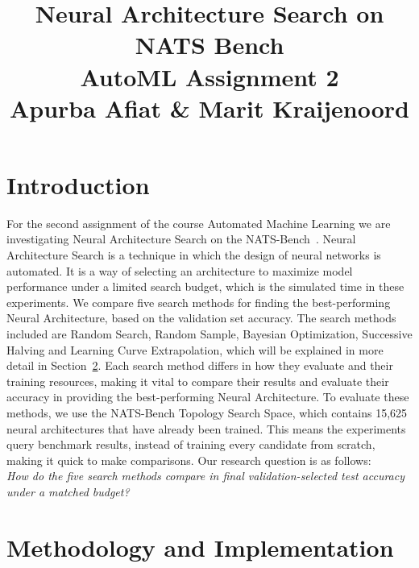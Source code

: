 \documentclass[12pt]{article}
\title{Neural Architecture Search on NATS Bench \\ \large AutoML Assignment 2 \\ \small Apurba Afiat \& Marit Kraijenoord}
\date{}
\author{}
\begin{document}
\maketitle

\vspace{-2.8cm}


\section{Introduction}
For the second assignment of the course Automated Machine Learning we are investigating Neural Architecture Search on the NATS-Bench~\cite{dong2022natsbench}. Neural Architecture Search is a technique in which the design of neural networks is automated. It is a way of selecting an architecture to maximize model performance under a limited search budget, which is the simulated time in these experiments. We compare five search methods for finding the best-performing Neural Architecture, based on the validation set accuracy. The search methods included are Random Search, Random Sample, Bayesian Optimization, Successive Halving and Learning Curve Extrapolation, which will be explained in more detail in Section~\ref{methods}. Each search method differs in how they evaluate and their training resources, making it vital to compare their results and evaluate their accuracy in providing the best-performing Neural Architecture. To evaluate these methods, we use the NATS-Bench Topology Search Space, which contains 15,625 neural architectures that have already been trained. This means the experiments query benchmark results, instead of training every candidate from scratch, making it quick to make comparisons. Our research question is as follows: \\
\textit{How do the five search methods compare in final validation-selected test accuracy under a matched budget?}

\section{Methodology and Implementation}\label{methods}
\end{document}
